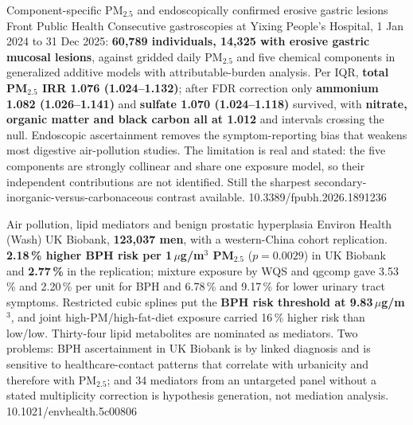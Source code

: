 \documentclass[10pt]{article}
\begin{document}
{Component-specific PM$_{2.5}$ and endoscopically confirmed erosive gastric lesions}
{Front Public Health}
{Consecutive gastroscopies at Yixing People's Hospital, 1 Jan 2024 to 31 Dec 2025:
\textbf{60,789 individuals, 14,325 with erosive gastric mucosal lesions}, against gridded
daily PM$_{2.5}$ and five chemical components in generalized additive models with
attributable-burden analysis. Per IQR, \textbf{total PM$_{2.5}$ IRR 1.076
(1.024--1.132)}; after FDR correction only \textbf{ammonium 1.082 (1.026--1.141)} and
\textbf{sulfate 1.070 (1.024--1.118)} survived, with \textbf{nitrate, organic matter and
black carbon all at 1.012} and intervals crossing the null. Endoscopic ascertainment
removes the symptom-reporting bias that weakens most digestive air-pollution studies.
The limitation is real and stated: the five components are strongly collinear and
share one exposure model, so their independent contributions are not identified. Still
the sharpest secondary-inorganic-versus-carbonaceous contrast available.}
{10.3389/fpubh.2026.1891236}

{Air pollution, lipid mediators and benign prostatic hyperplasia}
{Environ Health (Wash)}
{UK Biobank, \textbf{123,037 men}, with a western-China cohort replication.
\textbf{2.18\,\% higher BPH risk per 1\,$\mu$g/m$^3$ PM$_{2.5}$} ($p=0.0029$) in UK
Biobank and \textbf{2.77\,\%} in the replication; mixture exposure by WQS and qgcomp gave
3.53\,\% and 2.20\,\% per unit for BPH and 6.78\,\% and 9.17\,\% for lower urinary tract
symptoms. Restricted cubic splines put the \textbf{BPH risk threshold at
9.83\,$\mu$g/m$^3$}, and joint high-PM/high-fat-diet exposure carried 16\,\% higher risk
than low/low. Thirty-four lipid metabolites are nominated as mediators. Two problems:
BPH ascertainment in UK Biobank is by linked diagnosis and is sensitive to
healthcare-contact patterns that correlate with urbanicity and therefore with PM$_{2.5}$;
and 34 mediators from an untargeted panel without a stated multiplicity correction is
hypothesis generation, not mediation analysis.}
{10.1021/envhealth.5c00806}

\clearpage

\end{document}
